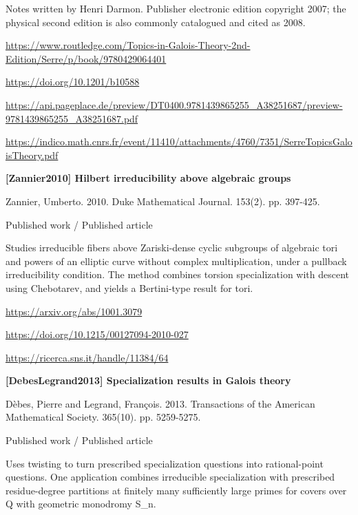 \documentclass[11pt,a4paper,oneside,openany]{book}
\begin{document}
{\small Notes written by Henri Darmon. Publisher electronic edition copyright 2007; the physical second edition is also commonly catalogued and cited as 2008.}\par
{\footnotesize\url{https://www.routledge.com/Topics-in-Galois-Theory-2nd-Edition/Serre/p/book/9780429064401}}\par
{\footnotesize\url{https://doi.org/10.1201/b10588}}\par
{\footnotesize\url{https://api.pageplace.de/preview/DT0400.9781439865255_A38251687/preview-9781439865255_A38251687.pdf}}\par
{\footnotesize\url{https://indico.math.cnrs.fr/event/11410/attachments/4760/7351/SerreTopicsGaloisTheory.pdf}}\par
\vspace{9pt}
\hypertarget{ref:Zannier2010}{}
{\sffamily\bfseries\color{atlasgreen}[Zannier2010] Hilbert irreducibility above algebraic groups}\par
\color{black} Zannier, Umberto. 2010. Duke Mathematical Journal. 153(2). pp. 397-425.\par
{\small\sffamily\color{atlasgold}Published work / Published article}\par
\color{black} Studies irreducible fibers above Zariski-dense cyclic subgroups of algebraic tori and powers of an elliptic curve without complex multiplication, under a pullback irreducibility condition. The method combines torsion specialization with descent using Chebotarev, and yields a Bertini-type result for tori.\par
{\footnotesize\url{https://arxiv.org/abs/1001.3079}}\par
{\footnotesize\url{https://doi.org/10.1215/00127094-2010-027}}\par
{\footnotesize\url{https://ricerca.sns.it/handle/11384/64}}\par
\vspace{9pt}
\hypertarget{ref:DebesLegrand2013}{}
{\sffamily\bfseries\color{atlasgreen}[DebesLegrand2013] Specialization results in Galois theory}\par
\color{black} Dèbes, Pierre and Legrand, François. 2013. Transactions of the American Mathematical Society. 365(10). pp. 5259-5275.\par
{\small\sffamily\color{atlasgold}Published work / Published article}\par
\color{black} Uses twisting to turn prescribed specialization questions into rational-point questions. One application combines irreducible specialization with prescribed residue-degree partitions at finitely many sufficiently large primes for covers over Q with geometric monodromy S\_\allowbreak{}n.\par
\end{document}
